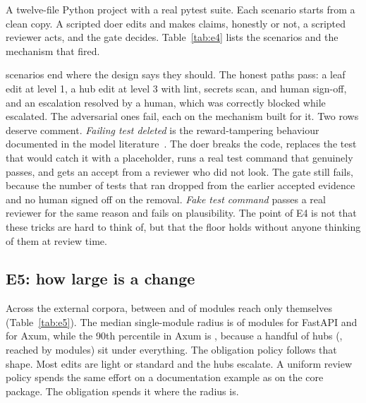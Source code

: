 \documentclass[conference]{IEEEtran}
\begin{document}
A twelve-file Python project with a real pytest suite. Each scenario starts from a clean copy. A scripted doer edits and makes claims, honestly or not, a scripted reviewer acts, and the gate decides. Table~\ref{tab:e4} lists the scenarios and the mechanism that fired.

\begin{table}[t]
  \centering\footnotesize
  \caption{E4: scripted doer behaviours and the gate's decision. A rejected ledger entry is treated as absent, so the forged scenario reports only the signature mechanism.}
  \label{tab:e4}
  
\end{table}

\EFourAllExpected{} \EFourScenarios{} scenarios end where the design says they should. The \EFourPassed{} honest paths pass: a leaf edit at level 1, a hub edit at level 3 with lint, secrets scan, and human sign-off, and an escalation resolved by a human, which was correctly blocked while escalated. The \EFourBlocked{} adversarial ones fail, each on the mechanism built for it. Two rows deserve comment. \emph{Failing test deleted} is the reward-tampering behaviour documented in the model literature~\citep{denison2024subterfuge}. The doer breaks the code, replaces the test that would catch it with a placeholder, runs a real test command that genuinely passes, and gets an accept from a reviewer who did not look. The gate still fails, because the number of tests that ran dropped from the earlier accepted evidence and no human signed off on the removal. \emph{Fake test command} passes a real reviewer for the same reason and fails on plausibility. The point of E4 is not that these tricks are hard to think of, but that the floor holds without anyone thinking of them at review time.

\subsection{E5: how large is a change}

\begin{table}[t]
  \centering\footnotesize
  \caption{E5: single-module blast radius as a fraction of all modules, and the number of modules whose edit falls at each obligation level.}
  \label{tab:e5}
  \resizebox{\linewidth}{!}{}
\end{table}

Across the external corpora, between \EFiveMinSingle{} and \EFiveMaxSingle{} of modules reach only themselves (Table~\ref{tab:e5}). The median single-module radius is \EFiveFastapiMedian{} of modules for FastAPI and \EFiveAxumMedian{} for Axum, while the 90th percentile in Axum is \EFiveAxumPninety{}, because a handful of hubs (\EFiveAxumTopModule{}, reached by \EFiveAxumTopBr{} modules) sit under everything. The obligation policy follows that shape. Most edits are light or standard and the hubs escalate. A uniform review policy spends the same effort on a documentation example as on the core package. The obligation spends it where the radius is.
\end{document}
